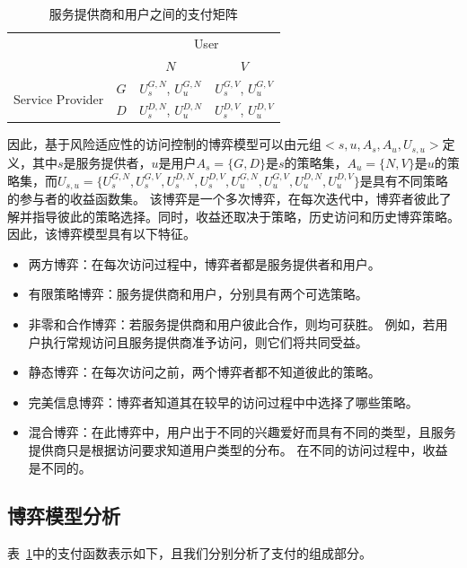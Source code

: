 \begin{table}[htb]
	\caption{服务提供商和用户之间的支付矩阵}\label{tab:payoff}
	\centering 
	\begin{tabular}{cccc}
		\toprule
		\multicolumn{2}{c}{\multirow{2}{*}{}} & \multicolumn{2}{c}{User} \\
		\cline{3-4}
		& & $N$ & $V$ \\	
		\hline
		\multirow{2}{*}{Service Provider} & $G$ &$U_s^{G,N}$, $U_u^{G,N}$ & $U_s^{G,V}$, $U_u^{G,V}$\\
		\cline{2-4}
		& $D$ & $U_s^{D,N}$, $U_u^{D,N}$ & $U_s^{D,V}$, $U_u^{D,V}$\\
		\toprule
	\end{tabular}
\end{table}


因此，基于风险适应性的访问控制的博弈模型可以由元组$<s,u,A_s,A_u,U_{s,u}>$定义，其中$s$是服务提供者，$u$是用户$A_s=\{G,D\}$是$s$的策略集，$A_u=\{N,V\}$是$u$的策略集，而$U_{s,u}=\{U_s^{G,N}, U_s^{G,V}, U_s^{D,N}, U_s^{D,V}, U_u^{G,N}, U_u^{G,V}, U_u^{D,N}, U_u^{D,V}\}$是具有不同策略的参与者的收益函数集。 该博弈是一个多次博弈，在每次迭代中，博弈者彼此了解并指导彼此的策略选择。同时，收益还取决于策略，历史访问和历史博弈策略。 因此，该博弈模型具有以下特征。
\begin{itemize}
	\item 两方博弈：在每次访问过程中，博弈者都是服务提供者和用户。
	\item 有限策略博弈：服务提供商和用户，分别具有两个可选策略。
	\item 非零和合作博弈：若服务提供商和用户彼此合作，则均可获胜。 例如，若用户执行常规访问且服务提供商准予访问，则它们将共同受益。
	\item 静态博弈：在每次访问之前，两个博弈者都不知道彼此的策略。
	\item 完美信息博弈：博弈者知道其在较早的访问过程中中选择了哪些策略。
	\item 混合博弈：在此博弈中，用户出于不同的兴趣爱好而具有不同的类型，且服务提供商只是根据访问要求知道用户类型的分布。 在不同的访问过程中，收益是不同的。
\end{itemize}

\subsection{博弈模型分析}

表~\ref{tab:payoff}中的支付函数表示如下，且我们分别分析了支付的组成部分。

